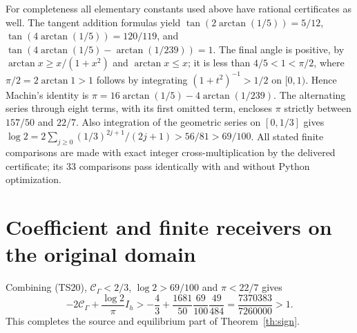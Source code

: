 \documentclass[11pt]{article}
\begin{document}
For completeness all elementary constants used above have rational
certificates as well. The tangent addition formulas yield
$\tan(2\arctan(1/5))=5/12$,
$\tan(4\arctan(1/5))=120/119$, and
$\tan(4\arctan(1/5)-\arctan(1/239))=1$.
The final angle is positive, by
$\arctan x\geq x/(1+x^2)$ and $\arctan x\leq x$;
it is less than $4/5<1<\pi/2$, where
$\pi/2=2\arctan1>1$ follows by integrating $(1+t^2)^{-1}>1/2$
on $[0,1)$. Hence Machin's identity is
$\pi=16\arctan(1/5)-4\arctan(1/239)$.
The alternating series through eight terms, with its first omitted
term, encloses $\pi$ strictly between $157/50$ and $22/7$.
Also integration of the geometric series on $[0,1/3]$ gives
$\log2=2\sum_{j\geq0}(1/3)^{2j+1}/(2j+1)>56/81>69/100$.
All stated finite comparisons are made with exact integer
cross-multiplication by the delivered certificate; its 33 comparisons
pass identically with and without Python optimization.

\section{Coefficient and finite receivers on the original domain}
Combining (TS20), $\mathcal C_\Gamma<2/3$, $\log2>69/100$ and
$\pi<22/7$ gives
\begin{equation}\tag{TS36}
 -2\mathcal C_\Gamma+\frac{\log2}{\pi}I_h
 >-\frac43+\frac{1681}{50}\frac{69}{100}\frac{49}{484}
 =\frac{7370383}{7260000}>1.
\end{equation}
This completes the source and equilibrium part of Theorem~\ref{th:sign}.
\end{document}
